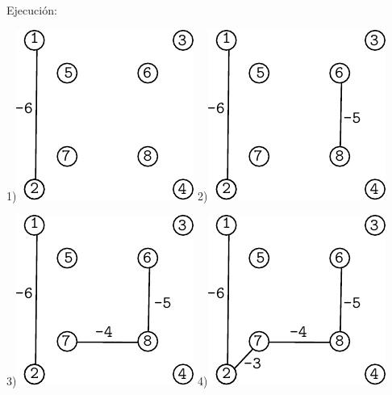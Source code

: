 \documentclass{article}
\begin{document}
Ejecución:

\begin{center}
1)\includegraphics[scale=1]{kruskal/p2}
\hspace{10mm}
2)\includegraphics[scale=1]{kruskal/p3}
\end{center}

\begin{center}
3)\includegraphics[scale=1]{kruskal/p4}
\hspace{10mm}
4)\includegraphics[scale=1]{kruskal/p5}
\end{center}
\end{document}
